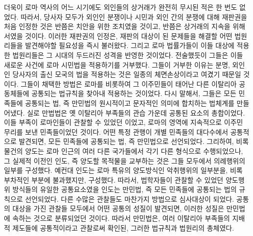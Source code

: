 더욱이 로마 역사의 어느 시기에도 외인들의 상거래가 완전히 무시된 적은
한 번도 없었다.
따라서,
당사자 모두가 외인인 분쟁이나 시민과 외인 간의 분쟁에 대해
재판권을 처음 인정한 것은
반쯤은 치안을 위한 조치였을 것이고, 반쯤은 상거래의 지속을 위해서였을 것이다.
이러한 재판권의 인정은, 재판의 대상이 된 문제들을 해결할 어떤 법원리들을
발견해야할 필요성을 즉시 불러왔다. 그리고
로마 법률가들이 이들 대상에 적용한 법원리들은 그 시대의
두드러진 성격을 반영한 것이었다.
전술했듯이 그들은 이들 새로운 사건에 로마 시민법을 적용하기를 거부했다.
그들이 거부한 이유는 분명, 외인인 당사자의 출신 모국의 법을 적용하는 것은
일종의 체면손상이라고 여겼기 때문일 것이다.
그들이 채택한 방법은 로마를 비롯하여
그 이주민들이 태어난 다른 이탈리아 공동체들에
공통되는 법규칙을 찾아내 적용하는 것이었다.
다시 말해서, 그들은
모든 민족들에 공통되는 법, 즉 만민법의 원시적이고
문자적인 의미에 합치하는 법체계를 만들어냈다.
실로 만법법은 옛 이탈리아 부족들의 관습 가운데 공통된 요소의 총합이었다.
이들 부족이 로마인들이 관찰할 수 있었던 이었고,
로마의 영역에 지속적으로 이주민 무리를 보낸 민족들이었던 것이다.
어떤 특정 관행이 개별 민족들의 대다수에서 공통적으로 발견되면,
모든 민족들에 공통되는 법, 즉 만민법으로 선언되었다.
그리하여,
비록 물건의 양도는 로마 인근의 여러 다른 국가들에서 각기 다른 형식으로
수행되었으나, 그 실제적 이전인 인도, 즉
양도할 목적물을 교부하는 것은 그들 모두에서 의례행위의 일부를 구성했다.
예컨대 인도는 로마 특유의 양도방식인
악취행위의 일부분을, 비록
부차적인 부분에 불과했지만, 구성했다.
따라서,
법학자들이 관찰할 수 있었던 양도행위 방식들의 유일한
공통요소였을 인도는
만민법, 즉 모든 민족들에 공통되는 법의 규칙으로 선언되었다.
다른 수많은 관찰들도 마찬가지 방법으로 심사대상이 되었다.
공통의 대상을 가진 관찰들 모두에서
어떤 공통의 성질이 발견되면,
이러한 성질은 만민법에 속하는 것으로 분류되었던 것이다.
따라서 만민법은,
여러 이탈리아 부족들의 지배적 제도들에 공통적이라고
관찰로써 확인된,
그러한 법규칙과 법원리의 총체였다.

